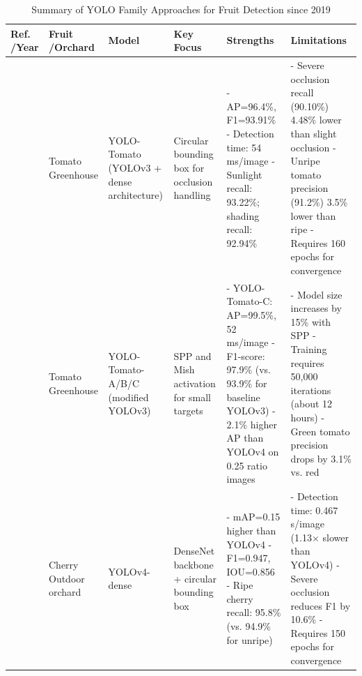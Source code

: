 \documentclass{ieeeaccess}
\begin{document}
\iffalse
\begin{table}[htbp]
	\centering
	\small
	\caption{Summary of YOLO Family Approaches for Fruit Detection since 2019} 
	\label{tab:yolo-based}
	\begin{tabular}{@{}p{}p{}p{}p{}p{}p{}@{}}
	\toprule
	\textbf{Ref. \newline /Year} & \textbf{Fruit \newline /Orchard} & \textbf{Model} & \textbf{Key Focus} & \textbf{Strengths} & \textbf{Limitations} \\ \midrule
	
	\cite{liu2020yolo} \newline 2020 & Tomato \newline Greenhouse & YOLO-Tomato (YOLOv3 + dense architecture) & Circular bounding box for occlusion handling & - AP=96.4\%, F1=93.91\% \newline - Detection time: 54 ms/image \newline - Sunlight recall: 93.22\%; shading recall: 92.94\% & - Severe occlusion recall (90.10\%) 4.48\% lower than slight occlusion \newline - Unripe tomato precision (91.2\%) 3.5\% lower than ripe \newline - Requires 160 epochs for convergence \\ \midrule
	\cite{lawal2021tomato} \newline 2021 & Tomato \newline Greenhouse & YOLO-Tomato-A/B/C (modified YOLOv3) & SPP and Mish activation for small targets & - YOLO-Tomato-C: AP=99.5\%, 52 ms/image \newline - F1-score: 97.9\% (vs. 93.9\% for baseline YOLOv3) \newline - 2.1\% higher AP than YOLOv4 on 0.25 ratio images & - Model size increases by 15\% with SPP \newline - Training requires 50,000 iterations (about 12 hours) \newline - Green tomato precision drops by 3.1\% vs. red \\ \midrule
	\cite{gai2023detection} \newline 2023 & Cherry \newline Outdoor orchard & YOLOv4-dense & DenseNet backbone + circular bounding box & - mAP=0.15 higher than YOLOv4 \newline - F1=0.947, IOU=0.856 \newline - Ripe cherry recall: 95.8\% (vs. 94.9\% for unripe) & - Detection time: 0.467 s/image (1.13× slower than YOLOv4) \newline - Severe occlusion reduces F1 by 10.6\% \newline - Requires 150 epochs for convergence \\ \midrule

\end{tabular}
\end{table}
\end{document}
